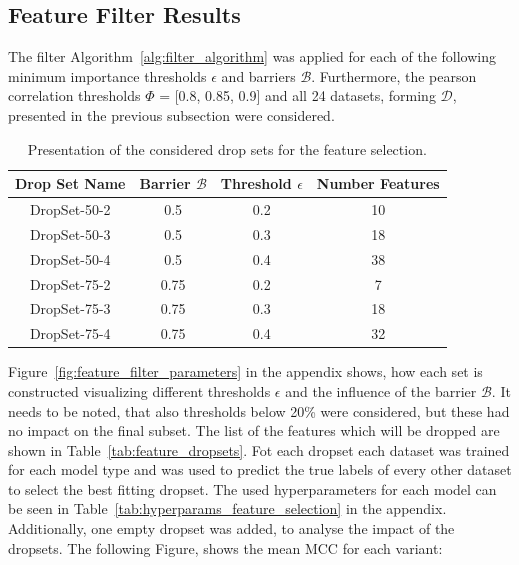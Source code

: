 \subsection{Feature Filter Results}
\label{sec:feature_filter_results}

The filter Algorithm~\ref{alg:filter_algorithm} was applied for each of the following minimum importance thresholds
$\epsilon$ and barriers $\mathcal{B}$. Furthermore, the pearson correlation thresholds $\Phi$ = [0.8, 0.85, 0.9] and
all 24 datasets, forming $\mathcal{D}$, presented in the previous subsection were considered.
\begin{table}[ht]
  \centering
  \begin{tabular}{c c c c}
    \toprule
    Drop Set Name & Barrier $\mathcal{B}$ & Threshold $\epsilon$ & Number Features \\
    \midrule
    DropSet-50-2  & 0.5                   & 0.2                  & 10              \\
    DropSet-50-3  & 0.5                   & 0.3                  & 18              \\
    DropSet-50-4  & 0.5                   & 0.4                  & 38              \\
    DropSet-75-2  & 0.75                  & 0.2                  & 7               \\
    DropSet-75-3  & 0.75                  & 0.3                  & 18              \\
    DropSet-75-4  & 0.75                  & 0.4                  & 32              \\
    \bottomrule
  \end{tabular}
  \caption{Presentation of the considered drop sets for the feature selection.}
  \label{tab:drop_set_presentation_shortened}
\end{table}

Figure~\ref{fig:feature_filter_parameters} in the appendix shows, how each set is constructed visualizing
different thresholds $\epsilon$ and the influence of the barrier $\mathcal{B}$. It needs to be noted, that
also thresholds below 20\% were considered, but these had no impact on the final subset. The list of the
features which will be dropped are shown in Table~\ref{tab:feature_dropsets}. Fot each dropset each dataset was trained
for each model type and was used to predict the true labels of every other dataset to select the best fitting dropset.
The used hyperparameters for each model can be seen in Table~\ref{tab:hyperparams_feature_selection} in the appendix.
Additionally, one empty dropset was added, to analyse the impact of the dropsets. The following Figure, shows the mean \gls{MCC}
for each variant:

